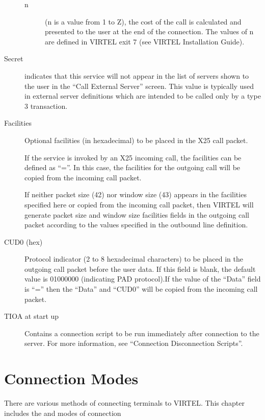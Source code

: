 \documentclass[letterpaper,10pt,english]{sphinxmanual}
\begin{document}
\begin{description}
\begin{description}
\item[{n}] \leavevmode
(n is a value from 1 to Z), the cost of the call is calculated and presented to the user at the end of the connection. The values of n are defined in VIRTEL exit 7 (see VIRTEL Installation Guide).

\end{description}

\item[{Secret}]  indicates that this service will not appear in the list of servers shown to the user in the “Call External Server” screen. This value is typically used in external server definitions which are intended to be called only by a type 3 transaction.

\item[{Facilities}] \leavevmode
Optional facilities (in hexadecimal) to be placed in the X25 call packet.

If the service is invoked by an X25 incoming call, the facilities can be defined as “=”. In this case, the facilities for the outgoing call will be copied from the incoming call packet.

If neither packet size (42) nor window size (43) appears in the facilities specified here or copied from the incoming call packet, then VIRTEL will generate packet size and window size facilities fields in the outgoing call packet according to the values specified in the outbound line definition.

\item[{CUD0 (hex)}] \leavevmode
Protocol indicator (2 to 8 hexadecimal characters) to be placed in the outgoing call packet before the user data. If this field is blank, the default value is 01000000 (indicating PAD protocol).If the value of the “Data” field is “=” then the “Data” and “CUD0” will be copied from the incoming call packet.

\item[{TIOA at start up}] \leavevmode
Contains a connection script to be run immediately after connection to the server. For more information, see “Connection \textendash{} Disconnection Scripts”.

\end{description}

\ignorespaces 

\chapter{Connection Modes}
\label{\detokenize{connectivity_guide:connection-modes}}\label{\detokenize{connectivity_guide:index-135}}
There are various methods of connecting terminals to VIRTEL. This chapter includes the  and  modes of connection
\end{document}
